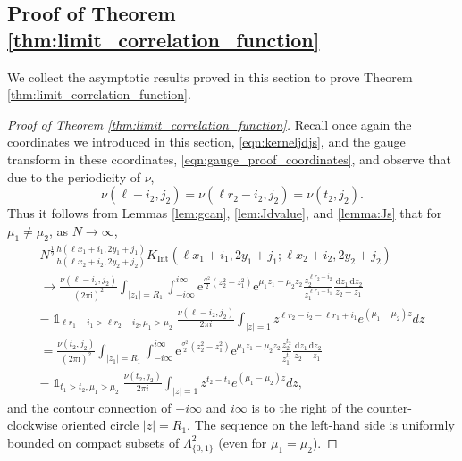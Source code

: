 \documentclass[11pt]{article}
\theoremstyle{plain}
\theoremstyle{definition}
\numberwithin{equation}{section}
\renewcommand{\d}{\,\mathrm{d}}
\renewcommand{\i}{\mathrm{i}}
\newcommand{\e}{\mathrm{e}}
\DeclareMathOperator{\one}{\mathds{1}}
\begin{document}
\subsection{Proof of Theorem \ref{thm:limit_correlation_function}}\label{sec:proof}
We collect the asymptotic results proved in this section to prove Theorem \ref{thm:limit_correlation_function}. 
%
%
%
\begin{proof}[Proof of Theorem \ref{thm:limit_correlation_function}]
Recall once again the coordinates we introduced in this section, \eqref{eqn:kerneljdjs}, and the gauge transform in these coordinates, \eqref{eqn:gauge_proof_coordinates}, and observe that due to the periodicity of $\nu$,
$$\nu(\ell-i_2,j_2)= \nu(\ell r_2-i_2,j_2)=\nu(t_2,j_2).$$
Thus it follows from Lemmas \ref{lem:gcan}, \ref{lem:Jdvalue}, and \ref{lemma:Js} that for $\mu_1\not=\mu_2$, as $N\rightarrow\infty$,
\begin{multline}\label{eqn:limit_in_proof}
 N^{\frac{1}{2}}
\frac{h(\ell x_1+i_1,2y_1+j_1)}{h(\ell x_2+i_2,2y_2+j_2)}
K_{\operatorname{Int}}(\ell x_1+i_1, 2y_1+j_1; \ell x_2+i_2, 2y_2+j_2 )
\\\rightarrow
%
%
\frac{\nu(\ell-i_2,j_2)}{(2\pi\i)^2}
\int_{|z_1|=R_1}
\int_{-i\infty}^{i\infty}
\e^{\frac{\sigma^2}{2}
(z_2^2-z_1^2)}\e^{\mu_1 z_1-\mu_2 z_2}\frac{z_2^{\ell r_2-i_2}}{z_1^{\ell r_1-i_1}}\frac{\d z_1\d z_2}{z_2-z_1}
\\ - \one_{\ell r_1-i_1>\ell r_2-i_2, \mu_1>\mu_2}
 \frac{\nu(\ell-i_2,j_2)}{2\pi i}\int_{|z|=1} 
 z^{\ell r_2-i_2-\ell r_1+i_1}
e^{(\mu_1-\mu_2) z}
dz
%
%
%
\\=
%
%
\frac{\nu(t_2,j_2)}{(2\pi\i)^2}
\int_{|z_1|=R_1}
\int_{-i\infty}^{i\infty}
\e^{\frac{\sigma^2}{2}
(z_2^2-z_1^2)}\e^{\mu_1 z_1-\mu_2 z_2}\frac{z_2^{t_2}}{z_1^{t_1}}\frac{\d z_1\d z_2}{z_2-z_1}
\\ - \one_{t_1>t_2, \mu_1>\mu_2}
 \frac{\nu(t_2, j_2)}{2\pi i}\int_{|z|=1} 
 z^{t_2-t_1}
e^{(\mu_1-\mu_2) z}
dz,
%
%
\end{multline}
 and the contour connection of $-i\infty$ and $i\infty$ is to the right of the counter-clockwise oriented circle $|z|=R_1$.
%
The 
sequence on the left-hand side is uniformly bounded on compact subsets of $\Lambda_{\{0,1\}}^2$ (even for $\mu_1=\mu_2$).


\end{proof}
\end{document}
